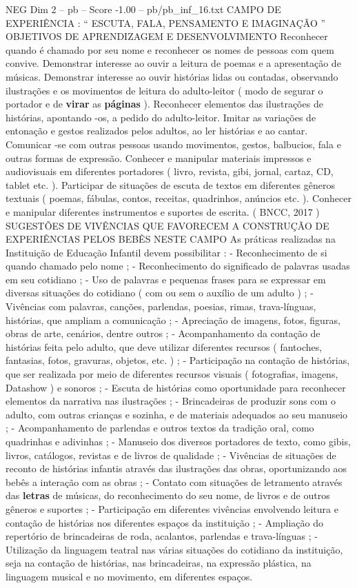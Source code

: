 \begin{textsample}{NEG Dim 2 – pb – Score -1.00 – pb/pb\_inf\_16.txt}  \label{ex:f2_neg_017}
CAMPO DE EXPERIÊNCIA : “ ESCUTA, FALA, PENSAMENTO E IMAGINAÇÃO ” OBJETIVOS DE APRENDIZAGEM E DESENVOLVIMENTO Reconhecer quando é chamado por seu nome e reconhecer os nomes de pessoas com quem convive.
Demonstrar interesse ao ouvir a leitura de poemas e a apresentação de músicas.
Demonstrar interesse ao ouvir histórias lidas ou contadas, observando ilustrações e os movimentos de leitura do adulto-leitor ( modo de segurar o portador e de \textbf{virar} as \textbf{páginas} ).
Reconhecer elementos das ilustrações de histórias, apontando -os, a pedido do adulto-leitor.
Imitar as variações de entonação e gestos realizados pelos adultos, ao ler histórias e ao cantar.
Comunicar -se com outras pessoas usando movimentos, gestos, balbucios, fala e outras formas de expressão.
Conhecer e manipular materiais impressos e audiovisuais em diferentes portadores ( livro, revista, gibi, jornal, cartaz, CD, tablet etc. ).
Participar de situações de escuta de textos em diferentes gêneros textuais ( poemas, fábulas, contos, receitas, quadrinhos, anúncios etc. ).
Conhecer e manipular diferentes instrumentos e suportes de escrita. ( BNCC, 2017 ) SUGESTÕES DE VIVÊNCIAS QUE FAVORECEM A CONSTRUÇÃO DE EXPERIÊNCIAS PELOS BEBÊS NESTE CAMPO As práticas realizadas na Instituição de Educação Infantil devem possibilitar : - Reconhecimento de si quando chamado pelo nome ; - Reconhecimento do significado de palavras usadas em seu cotidiano ; - Uso de palavras e pequenas frases para se expressar em diversas situações do cotidiano ( com ou sem o auxílio de um adulto ) ; - Vivências com palavras, canções, parlendas, poesias, rimas, trava-línguas, histórias, que ampliam a comunicação ; - Apreciação de imagens, fotos, figuras, obras de arte, cenários, dentre outros ; - Acompanhamento da contação de histórias feita pelo adulto, que deve utilizar diferentes recursos ( fantoches, fantasias, fotos, gravuras, objetos, etc. ) ; - Participação na contação de histórias, que ser realizada por meio de diferentes recursos visuais ( fotografias, imagens, Datashow ) e sonoros ; - Escuta de histórias como oportunidade para reconhecer elementos da narrativa nas ilustrações ; - Brincadeiras de produzir sons com o adulto, com outras crianças e sozinha, e de materiais adequados ao seu manuseio ; - Acompanhamento de parlendas e outros textos da tradição oral, como quadrinhas e adivinhas ; - Manuseio dos diversos portadores de texto, como gibis, livros, catálogos, revistas e de livros de qualidade ; - Vivências de situações de reconto de histórias infantis através das ilustrações das obras, oportunizando aos bebês a interação com as obras ; - Contato com situações de letramento através das \textbf{letras} de músicas, do reconhecimento do seu nome, de livros e de outros gêneros e suportes ; - Participação em diferentes vivências envolvendo leitura e contação de histórias nos diferentes espaços da instituição ; - Ampliação do repertório de brincadeiras de roda, acalantos, parlendas e trava-línguas ; - Utilização da linguagem teatral nas várias situações do cotidiano da instituição, seja na contação de histórias, nas brincadeiras, na expressão plástica, na linguagem musical e no movimento, em diferentes espaços.

\end{textsample}
